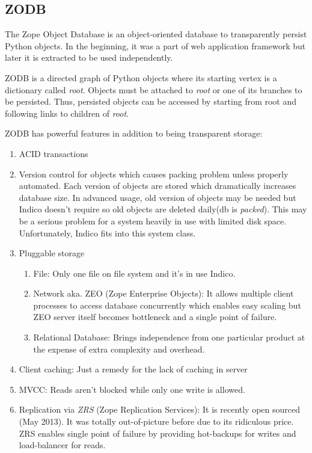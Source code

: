 \subsection{ZODB}

The Zope Object Database is an object-oriented database to transparently persist Python objects.
In the beginning, it was a part of web application framework but later it is extracted to be used independently.

ZODB is a directed graph of Python objects where its starting vertex is a dictionary called \textit{root}.
Objects must be attached to \textit{root} or one of its branches to be persisted.
Thus, persisted objects can be accessed by starting from root and following links to children of \textit{root}.

ZODB has powerful features in addition to being transparent storage:
\begin{enumerate}
  \item ACID transactions
  \item Version control for objects which causes packing problem unless properly automated. Each version of objects are stored which dramatically increases database size. In advanced usage, old version of objects may be needed but Indico doesn't require so old objects are deleted daily(db is \textit{packed}). This may be a serious problem for a system heavily in use with limited disk space. Unfortunately, Indico fits into this system class.
  \item Pluggable storage
  \begin{enumerate}
    \item File: Only one file on file system and it's in use Indico.
    \item Network aka. ZEO (Zope Enterprise Objects): It allows multiple client processes to access database concurrently which enables easy scaling but ZEO server itself becomes bottleneck and a single point of failure.
    \item Relational Database: Brings independence from one particular product at the expense of extra complexity and overhead.
  \end{enumerate}
  \item Client caching: Just a remedy for the lack of caching in server
  \item MVCC: Reads aren't blocked while only one write is allowed.
  \item Replication via \textit{ZRS} (Zope Replication Services): It is recently open sourced (May 2013). It was totally out-of-picture before due to its ridiculous price. ZRS enables single point of failure by providing hot-backups for writes and load-balancer for reads.
\end{enumerate}

